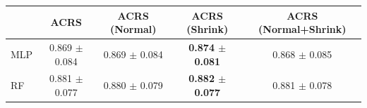 \begin{tabular}{lcccc}
\toprule
 & ACRS & ACRS (Normal) & ACRS (Shrink) & ACRS (Normal+Shrink) \\
\midrule
MLP & 0.869 $\pm$ 0.084 & 0.869 $\pm$ 0.084 & \textbf{0.874 $\pm$ 0.081} & 0.868 $\pm$ 0.085 \\
RF & 0.881 $\pm$ 0.077 & 0.880 $\pm$ 0.079 & \textbf{0.882 $\pm$ 0.077} & 0.881 $\pm$ 0.078 \\
\bottomrule
\end{tabular}
